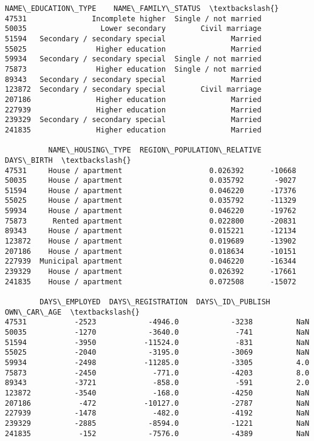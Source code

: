 \documentclass[11pt]{article}
\begin{document}
\begin{tcolorbox}[breakable, size=fbox, boxrule=.5pt, pad at break*=1mm, opacityfill=0]
\begin{Verbatim}[commandchars=\\\{\}]
                  NAME\_EDUCATION\_TYPE    NAME\_FAMILY\_STATUS  \textbackslash{}
47531               Incomplete higher  Single / not married
50035                 Lower secondary        Civil marriage
51594   Secondary / secondary special               Married
55025                Higher education               Married
59934   Secondary / secondary special  Single / not married
75873                Higher education  Single / not married
89343   Secondary / secondary special               Married
123872  Secondary / secondary special        Civil marriage
207186               Higher education               Married
227939               Higher education               Married
239329  Secondary / secondary special               Married
241835               Higher education               Married

          NAME\_HOUSING\_TYPE  REGION\_POPULATION\_RELATIVE  DAYS\_BIRTH  \textbackslash{}
47531     House / apartment                    0.026392      -10668
50035     House / apartment                    0.035792       -9027
51594     House / apartment                    0.046220      -17376
55025     House / apartment                    0.035792      -11329
59934     House / apartment                    0.046220      -19762
75873      Rented apartment                    0.022800      -20831
89343     House / apartment                    0.015221      -12134
123872    House / apartment                    0.019689      -13902
207186    House / apartment                    0.018634      -10151
227939  Municipal apartment                    0.046220      -16344
239329    House / apartment                    0.026392      -17661
241835    House / apartment                    0.072508      -15072

        DAYS\_EMPLOYED  DAYS\_REGISTRATION  DAYS\_ID\_PUBLISH  OWN\_CAR\_AGE  \textbackslash{}
47531           -2523            -4946.0            -3238          NaN
50035           -1270            -3640.0             -741          NaN
51594           -3950           -11524.0             -831          NaN
55025           -2040            -3195.0            -3069          NaN
59934           -2498           -11285.0            -3305          4.0
75873           -2450             -771.0            -4203          8.0
89343           -3721             -858.0             -591          2.0
123872          -3540             -168.0            -4250          NaN
207186           -472           -10127.0            -2787          NaN
227939          -1478             -482.0            -4192          NaN
239329          -2885            -8594.0            -1221          NaN
241835           -152            -7576.0            -4389          NaN


\end{Verbatim}
\end{tcolorbox}
\end{document}
